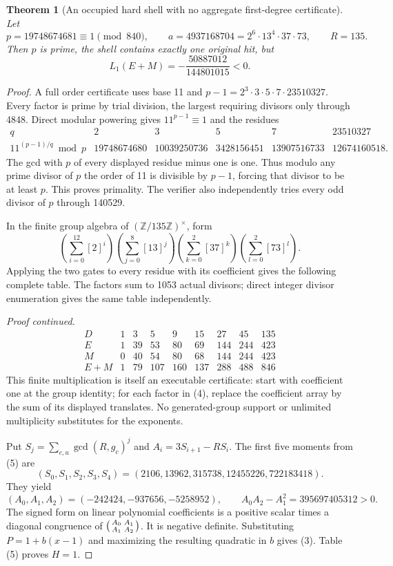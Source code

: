 \documentclass[10pt,a4paper]{article}
\newtheorem{theorem}{Theorem}
\begin{document}
\begin{theorem}[An occupied hard shell with no aggregate first-degree certificate]
Let
\[
 p=19748674681\equiv1\pmod{840},\qquad
 a=4937168704=2^6\cdot13^4\cdot37\cdot73,\qquad R=135.
 \tag{2}
\]
Then $p$ is prime, the shell contains exactly one original hit, but
\[
 L_1(E+M)=-\frac{50887012}{144801015}<0.
 \tag{3}
\]
\end{theorem}
\begin{proof}
A full order certificate uses base 11 and
$p-1=2^3\cdot3\cdot5\cdot7\cdot23510327$.
Every factor is prime by trial division, the largest requiring divisors only
through 4848. Direct modular powering gives $11^{p-1}\equiv1$ and the residues
\[
\begin{array}{c|rrrrr}
q&2&3&5&7&23510327\\\hline
11^{(p-1)/q}\bmod p&19748674680&10039250736&3428156451&13907516733&12674160518.
\end{array}
\]
The gcd with $p$ of every displayed residue minus one is one. Thus modulo any
prime divisor of $p$ the order of 11 is divisible by $p-1$, forcing that divisor
to be at least $p$. This proves primality. The verifier also independently
tries every odd divisor of $p$ through 140529.

In the finite group algebra of $(\mathbb Z/135\mathbb Z)^\times$, form
\[
 (\sum_{i=0}^{12}[2]^i)(\sum_{j=0}^{8}[13]^j)
 (\sum_{k=0}^{2}[37]^k)(\sum_{l=0}^{2}[73]^l).
 \tag{4}
\]
Applying the two gates to every residue with its coefficient gives the
following complete table. The factors sum to 1053 actual divisors; direct
integer divisor enumeration gives the same table independently.

\newpage
\noindent\emph{Proof continued.}
\[
\begin{array}{c|rrrrrrrr}
D&1&3&5&9&15&27&45&135\\\hline
E&1&39&53&80&69&144&244&423\\
M&0&40&54&80&68&144&244&423\\
E+M&1&79&107&160&137&288&488&846
\end{array}\tag{5}
\]
This finite multiplication is itself an executable certificate: start with
coefficient one at the group identity; for each factor in (4), replace the
coefficient array by the sum of its displayed translates. No generated-group
support or unlimited multiplicity substitutes for the exponents.

Put $S_j=\sum_{c,u}\gcd(R,g_c)^j$ and $A_i=3S_{i+1}-RS_i$. The first five
moments from (5) are
\[
(S_0,S_1,S_2,S_3,S_4)=(2106,13962,315738,12455226,722183418).
\]
They yield
\[
(A_0,A_1,A_2)=(-242424,-937656,-5258952),\qquad
A_0A_2-A_1^2=395697405312>0.
\]
The signed form on linear polynomial coefficients is a positive scalar times
a diagonal congruence of $\begin{psmallmatrix}A_0&A_1\\A_1&A_2\end{psmallmatrix}$.
It is negative definite. Substituting $P=1+b(x-1)$ and maximizing the resulting
quadratic in $b$ gives (3). Table (5) proves $H=1$.
\end{proof}
\end{document}
